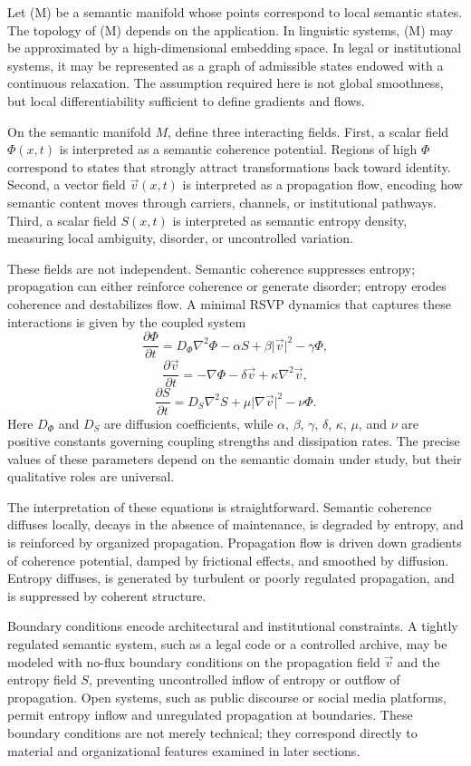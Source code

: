 \documentclass[11pt,oneside]{article}
\begin{document}
Let (M) be a semantic manifold whose points correspond to local semantic states. The topology of (M) depends on the application. In linguistic systems, (M) may be approximated by a high-dimensional embedding space. In legal or institutional systems, it may be represented as a graph of admissible states endowed with a continuous relaxation. The assumption required here is not global smoothness, but local differentiability sufficient to define gradients and flows.

On the semantic manifold $M$, define three interacting fields. First, a scalar field $\Phi(x,t)$ is interpreted as a semantic coherence potential. Regions of high $\Phi$ correspond to states that strongly attract transformations back toward identity. Second, a vector field $\vec v(x,t)$ is interpreted as a propagation flow, encoding how semantic content moves through carriers, channels, or institutional pathways. Third, a scalar field $S(x,t)$ is interpreted as semantic entropy density, measuring local ambiguity, disorder, or uncontrolled variation.

These fields are not independent. Semantic coherence suppresses entropy; propagation can either reinforce coherence or generate disorder; entropy erodes coherence and destabilizes flow. A minimal RSVP dynamics that captures these interactions is given by the coupled system
\[
\frac{\partial \Phi}{\partial t}
=
D_\Phi \nabla^2 \Phi
-
\alpha S
+
\beta \lvert \vec v \rvert^2
-
\gamma \Phi ,
\]
\[
\frac{\partial \vec v}{\partial t}
=
- \nabla \Phi
-
\delta \vec v
+
\kappa \nabla^2 \vec v ,
\]
\[
\frac{\partial S}{\partial t}
=
D_S \nabla^2 S
+
\mu \lvert \nabla \vec v \rvert^2
-
\nu \Phi .
\]
Here $D_\Phi$ and $D_S$ are diffusion coefficients, while $\alpha$, $\beta$, $\gamma$, $\delta$, $\kappa$, $\mu$, and $\nu$ are positive constants governing coupling strengths and dissipation rates. The precise values of these parameters depend on the semantic domain under study, but their qualitative roles are universal.

The interpretation of these equations is straightforward. Semantic coherence diffuses locally, decays in the absence of maintenance, is degraded by entropy, and is reinforced by organized propagation. Propagation flow is driven down gradients of coherence potential, damped by frictional effects, and smoothed by diffusion. Entropy diffuses, is generated by turbulent or poorly regulated propagation, and is suppressed by coherent structure.

Boundary conditions encode architectural and institutional constraints. A tightly regulated semantic system, such as a legal code or a controlled archive, may be modeled with no-flux boundary conditions on the propagation field $\vec v$ and the entropy field $S$, preventing uncontrolled inflow of entropy or outflow of propagation. Open systems, such as public discourse or social media platforms, permit entropy inflow and unregulated propagation at boundaries. These boundary conditions are not merely technical; they correspond directly to material and organizational features examined in later sections.
\end{document}
